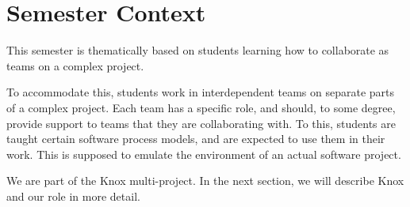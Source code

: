 \section{Semester Context}
This semester is thematically based on students learning how to collaborate as teams on a complex project.

To accommodate this, students work in interdependent teams on separate parts of a complex project. 
Each team has a specific role, and should, to some degree, provide support to teams that they are collaborating with.
To this, students are taught certain software process models, and are expected to use them in their work.
This is supposed to emulate the environment of an actual software project.

We are part of the Knox multi-project. In the next section, we will describe Knox and our role in more detail.
% 



% 
